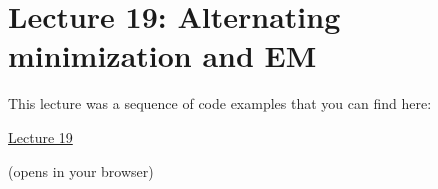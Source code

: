 \section{Lecture 19: Alternating minimization and EM}

This lecture was a sequence of code examples that you can find here:

\begin{center}
{\Large
\href{https://ee227c.github.io/code/lecture19.html}{Lecture 19}
}

(opens in your browser)
\end{center}


